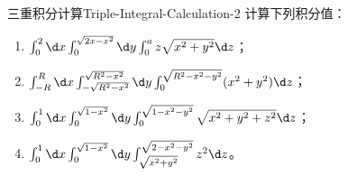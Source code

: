 \begin{problem}{三重积分计算}{Triple-Integral-Calculation-2}
    计算下列积分值：
    \begin{enumerate}
        \item $\int_{0}^{2} \d x \int_{0}^{\sqrt{2x-x^{2}}} \d y \int_{0}^{a} z \sqrt{x^{2}+y^{2}} \d z$；
        \item $\int_{-R}^{R} \d x \int_{-\sqrt{R^{2}-x^{2}}}^{\sqrt{R^{2}-x^{2}}} \d y \int_{0}^{\sqrt{R^{2}-x^{2}-y^{2}}} (x^{2}+y^{2}) \d z$；
        \item $\int_{0}^{1} \d x \int_{0}^{\sqrt{1-x^{2}}} \d y \int_{0}^{\sqrt{1-x^{2}-y^{2}}} \sqrt{x^{2}+y^{2}+z^{2}} \d z$；
        \item $\int_{0}^{1} \d x \int_{0}^{\sqrt{1-x^{2}}} \d y \int_{\sqrt{x^{2}+y^{2}}}^{\sqrt{2-x^{2}-y^{2}}} z^{2} \d z$。
    \end{enumerate}
\end{problem}


